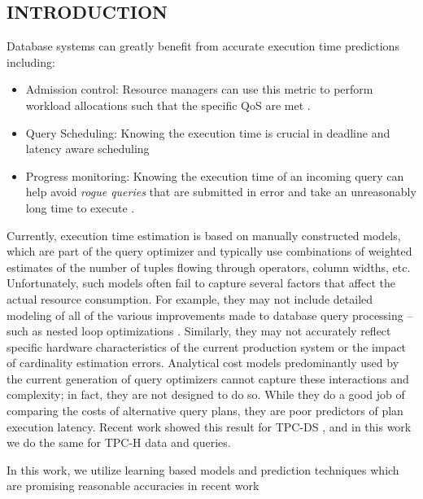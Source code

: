 \documentclass{article}
\begin{document}
	\begin{multicols}{2}
	\section{INTRODUCTION}
	Database systems can greatly benefit from accurate execution time predictions including: 
	\begin{itemize}
	\item Admission control: Resource managers can use this metric to perform workload allocations such that the specific QoS are met \cite{activeSLA}.
	\item Query Scheduling: Knowing the execution time is crucial in deadline and latency aware 			scheduling
	\item Progress monitoring: Knowing the execution time of an incoming query can help avoid \textit{rogue queries} that are submitted in error and take an unreasonably long time to execute \cite{progress}.
	\end{itemize}
	Currently, execution time estimation is based on manually constructed
	models, which are part of the query optimizer and typically use
	combinations of weighted estimates of the number of tuples flowing
	through operators, column widths, etc. Unfortunately, such
	models often fail to capture several factors that affect the actual
	resource consumption. For example, they may not include detailed
	modeling of all of the various improvements made to database query
	processing – such as nested loop optimizations \cite{nestedloops}. 
	Similarly, they may not accurately reflect
	specific hardware characteristics of the current production system
	or the impact of cardinality estimation errors. Analytical cost models predominantly 
	used by the current generation of query optimizers cannot
	capture these interactions and complexity; in fact, they are not designed to do so. 
	While they do a good job of comparing the costs of alternative query plans,
	they are poor predictors of plan execution latency. 
	Recent work \cite{ganapathi} showed this result for TPC-DS \cite{TPCDS}, and 
	in this work we do the same for TPC-H \cite{TPCH} data and queries.
	
	In this work, we utilize learning based models and prediction techniques which are promising reasonable accuracies in recent work \cite{ganapathi,MSR,ICDE2012}
	

\end{multicols}
\end{document}
